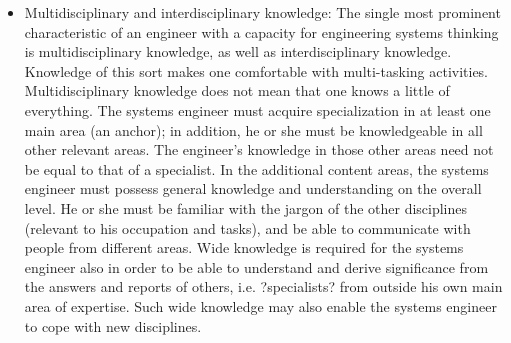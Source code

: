 \documentclass[11pt]{article}
\begin{document}
\begin{itemize}
\item Multidisciplinary and interdisciplinary knowledge: The single most prominent characteristic of an engineer with a capacity for engineering systems thinking is multidisciplinary knowledge, as well as interdisciplinary knowledge. Knowledge of this sort makes one comfortable with multi-tasking activities. Multidisciplinary knowledge does not mean that one knows a little of everything. The systems engineer must acquire specialization in at least one main area (an anchor); in addition, he or she must be knowledgeable in all other relevant areas.  The engineer's knowledge in those other areas need not be equal to that of a specialist. In the additional content areas, the systems engineer must possess general knowledge and understanding on the overall level. He or she must be familiar with the jargon of the other disciplines (relevant to his occupation and tasks), and be able to communicate with people from different areas. Wide knowledge is required for the systems engineer also in order to be able to understand and derive significance from the answers and reports of others, i.e. ?specialists? from outside his own main area of expertise. Such wide knowledge may also enable the systems engineer to cope with new disciplines.
\end{itemize}
\end{document}
